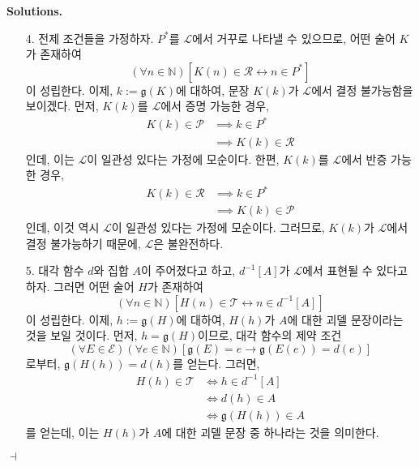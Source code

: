\documentclass[12pt]{paper}
\newcommand{\gnum}
{ \mathfrak{g} }
\newenvironment{context}[1][]
{ \noindent \textbf{{#1}.} }
{ \hfill $ \dashv $ }
\begin{document}
\begin{context}[Solutions]
\begin{enumerate}
\item[{4.}] 전제 조건들을 가정하자.
$P^{*}$를 $\mathcal{L}$에서 거꾸로 나타낼 수 있으므로,
어떤 술어 $K$가 존재하여 $$ \left( \forall n \in \mathbb{N} \right) \left[ K \left( n \right) \in \mathcal{R} \leftrightarrow n \in P^{*} \right] $$이 성립한다.
이제, $k := \gnum \left( K \right)$에 대하여, 문장 $K \left( k \right)$가 $\mathcal{L}$에서 결정 불가능함을 보이겠다.
먼저, $K \left( k \right)$를 $\mathcal{L}$에서 증명 가능한 경우,
\begin{align*}
K \left( k \right) \in \mathcal{P}
& \implies k \in P^{*} \\
& \implies K \left( k \right) \in \mathcal{R}
\end{align*}
인데, 이는 $\mathcal{L}$이 일관성 있다는 가정에 모순이다.
한편, $K \left( k \right)$를 $\mathcal{L}$에서 반증 가능한 경우,
\begin{align*}
K \left( k \right) \in \mathcal{R}
& \implies k \in P^{*} \\
& \implies K \left( k \right) \in \mathcal{P}
\end{align*}
인데, 이것 역시 $\mathcal{L}$이 일관성 있다는 가정에 모순이다.
그러므로, $K \left( k \right)$가 $\mathcal{L}$에서 결정 불가능하기 때문에, $\mathcal{L}$은 불완전하다.

\item[{5.}] 대각 함수 $d$와 집합 $A$이 주어졌다고 하고,
$d^{-1} \left[ A \right]$가 $\mathcal{L}$에서 표현될 수 있다고 하자.
그러면 어떤 술어 $H$가 존재하여 $$ \left( \forall n \in \mathbb{N} \right) \left[ H \left( n \right) \in \mathcal{T} \leftrightarrow n \in d^{-1} \left[ A \right] \right]$$이 성립한다.
이제, $h := \gnum \left( H \right)$에 대하여, $H \left( h \right)$가 $A$에 대한 괴델 문장이라는 것을 보일 것이다.
먼저, $h = \gnum \left( H \right)$이므로,
대각 함수의 제약 조건 $$ \left( \forall E \in \mathcal{E} \right) \left( \forall e \in \mathbb{N} \right) \left[ \gnum \left( E \right) = e \rightarrow \gnum \left( E \left( e \right) \right) = d \left( e \right) \right] $$로부터,
$ \gnum \left( H \left( h \right) \right) = d \left( h \right) $를 얻는다.
그러면,
\begin{align*}
H \left( h \right) \in \mathcal{T}
& \iff h \in d^{-1} \left[ A \right] \\
& \iff d \left( h \right) \in A \\
& \iff \gnum \left( H \left( h \right) \right) \in A
\end{align*}
를 얻는데,
이는 $H \left( h \right)$가 $A$에 대한 괴델 문장 중 하나라는 것을 의미한다.


\end{enumerate}
\end{context}
\end{document}

